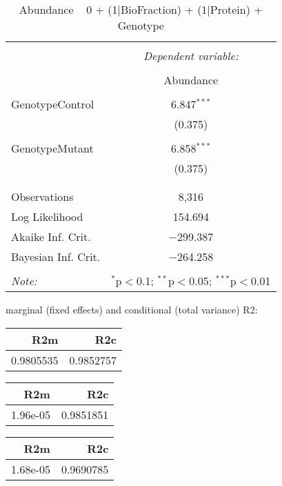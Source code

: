 \documentclass[11pt]{report}
\begin{document}
\begin{table}[!htbp] \centering 
  \caption{Abundance ~ 0 + (1|BioFraction) + (1|Protein) + Genotype} 
  \label{} 
\begin{tabular}{@{\extracolsep{5pt}}lc} 
\\[-1.8ex]\hline 
\hline \\[-1.8ex] 
 & \multicolumn{1}{c}{\textit{Dependent variable:}} \\ 
\cline{2-2} 
\\[-1.8ex] & Abundance \\ 
\hline \\[-1.8ex] 
 GenotypeControl & 6.847$^{***}$ \\ 
  & (0.375) \\ 
  & \\ 
 GenotypeMutant & 6.858$^{***}$ \\ 
  & (0.375) \\ 
  & \\ 
\hline \\[-1.8ex] 
Observations & 8,316 \\ 
Log Likelihood & 154.694 \\ 
Akaike Inf. Crit. & $-$299.387 \\ 
Bayesian Inf. Crit. & $-$264.258 \\ 
\hline 
\hline \\[-1.8ex] 
\textit{Note:}  & \multicolumn{1}{r}{$^{*}$p$<$0.1; $^{**}$p$<$0.05; $^{***}$p$<$0.01} \\ 
\end{tabular} 
\end{table} 
marginal (fixed effects) and conditional (total variance) R2:

\begin{tabular}{r|r}
\hline
R2m & R2c\\
\hline
0.9805535 & 0.9852757\\
\hline
\end{tabular}

\begin{tabular}{r|r}
\hline
R2m & R2c\\
\hline
1.96e-05 & 0.9851851\\
\hline
\end{tabular}

\begin{tabular}{r|r}
\hline
R2m & R2c\\
\hline
1.68e-05 & 0.9690785\\
\hline
\end{tabular}
\end{document}
